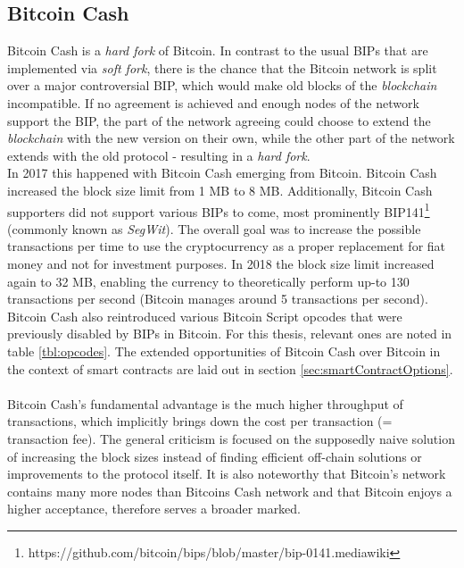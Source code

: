 \documentclass{cacthesis}
\newcounter{protocol}
\begin{document}
        \subsection{Bitcoin Cash}
        \label{sec:BitcoinCash}
        Bitcoin Cash is a \textit{hard fork} of Bitcoin. In contrast to the usual BIPs that are implemented via \textit{soft fork}, there is the chance that the Bitcoin network is split over a major controversial BIP, which would make old blocks of the \textit{blockchain} incompatible. If no agreement is achieved and enough nodes of the network support the BIP, the part of the network agreeing could choose to extend the \textit{blockchain} with the new version on their own, while the other part of the network extends with the old protocol - resulting in a \textit{hard fork}. \\
        In 2017 this happened with Bitcoin Cash emerging from Bitcoin. Bitcoin Cash increased the block size limit from 1 MB to 8 MB. Additionally, Bitcoin Cash supporters did not support various BIPs to come, most prominently BIP141\footnote{https://github.com/bitcoin/bips/blob/master/bip-0141.mediawiki} (commonly known as \textit{SegWit}). The overall goal was to increase the possible transactions per time to use the cryptocurrency as a proper replacement for fiat money and not for investment purposes. In 2018 the block size limit increased again to 32 MB, enabling the currency to theoretically perform up-to 130 transactions per second (Bitcoin manages around 5 transactions per second). Bitcoin Cash also reintroduced various Bitcoin Script opcodes that were previously disabled by BIPs in Bitcoin. For this thesis, relevant ones are noted in table \ref{tbl:opcodes}. The extended opportunities of Bitcoin Cash over Bitcoin in the context of smart contracts are laid out in section \ref{sec:smartContractOptions}. \\\\
        Bitcoin Cash's fundamental advantage is the much higher throughput of transactions, which implicitly brings down the cost per transaction (= transaction fee). The general criticism is focused on the supposedly naive solution of increasing the block sizes instead of finding efficient off-chain solutions or improvements to the protocol itself. It is also noteworthy that Bitcoin's network contains many more nodes than Bitcoins Cash network and that Bitcoin enjoys a higher acceptance, therefore serves a broader marked.
        
\end{document}
